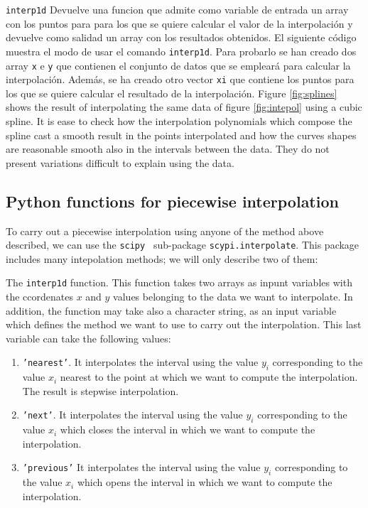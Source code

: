 \begin{paracol}{2}
\texttt{interp1d} Devuelve una funcion que admite como variable de entrada un array con los puntos para para los que se quiere calcular el valor de la interpolación y devuelve como salidad un array con los resultados obtenidos. El siguiente código muestra el modo de usar el comando \texttt{interp1d}. Para probarlo se han creado dos array \texttt{x} e \texttt{y} que contienen el conjunto de datos que se empleará para calcular la interpolación. Además, se ha creado otro vector \texttt{xi} que contiene los puntos para los que se quiere calcular el resultado de la interpolación.
\switchcolumn
Figure \ref{fig:splines} shows the result of interpolating the same data of figure \ref{fig:intepol} using a cubic spline. It is ease to check how the interpolation polynomials which compose the spline cast a smooth result in the points interpolated and how the curves shapes are reasonable smooth also in the intervals between the data. They do not present variations difficult to explain using the data.

\subsection{Python functions for piecewise interpolation}
To carry out a piecewise interpolation using anyone of the method above described, we can use the \texttt{scipy } sub-package \texttt{scypi.interpolate}. This package includes many intepolation me\-thods; we will only describe two of them:

The \texttt{interp1d} function. This function takes two arrays as inpunt variables with the ccordenates $x$ and $y$ values belonging to the data we want to interpolate. In addition, the function may take also a character string, as an input variable which defines the method we want to use to carry out the interpolation. This last variable can take the following values:
\begin{enumerate}
	\item \texttt{'nearest'}. It interpolates the interval using the value  $y_i$ corresponding to the value $x_i$ nearest to the point at which we want to compute the interpolation. The result is stepwise interpolation.
	\item \texttt{'next'}. It interpolates the interval using the value  $y_i$ corresponding to the value $x_i$ which closes the interval  in  which we want to compute the interpolation.
	\item \texttt{'previous'} It interpolates the interval using the value  $y_i$ corresponding to the value $x_i$ which opens the interval in which we want to compute the interpolation.
	

\end{enumerate}
\end{paracol}
